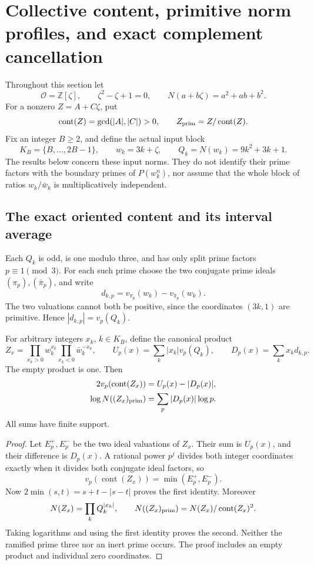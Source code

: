 \section{Collective content, primitive norm profiles, and exact complement cancellation}
\label{sec-cc-collective-profile}

Throughout this section let
\[
 \mathcal O=\mathbb Z[\zeta],\qquad \zeta^2-\zeta+1=0,\qquad
 N(a+b\zeta)=a^2+ab+b^2.
\]
For a nonzero \(Z=A+C\zeta\), put
\[
 \operatorname{cont}(Z)=\gcd(|A|,|C|)>0,
 \qquad Z_{\rm prim}=Z/\operatorname{cont}(Z).
\]
Fix an integer \(B\ge2\), and define the actual input block
\[
 K_B=\{B,\ldots,2B-1\},\qquad w_k=3k+\zeta,
 \qquad Q_k=N(w_k)=9k^2+3k+1.
\]
The results below concern these input norms. They do not identify their
prime factors with the boundary primes of \(P(w_k^n)\), nor assume that
the whole block of ratios \(w_k/\bar w_k\) is multiplicatively independent.

\subsection{The exact oriented content and its interval average}

Each \(Q_k\) is odd, is one modulo three, and has only split prime
factors \(p\equiv1\pmod3\). For each such prime choose the two conjugate
prime ideals \((\pi_p),(\bar\pi_p)\), and write
\[
 d_{k,p}=v_{\pi_p}(w_k)-v_{\bar\pi_p}(w_k).
\]
The two valuations cannot both be positive, since the coordinates
\((3k,1)\) are primitive. Hence \(|d_{k,p}|=v_p(Q_k)\).

\begin{lemma}
\label{cc-signed-content}
For arbitrary integers \(x_k\), \(k\in K_B\), define the canonical product
\[
 Z_x=\prod_{x_k>0}w_k^{x_k}
           \prod_{x_k<0}\bar w_k^{-x_k},\qquad
 U_p(x)=\sum_k|x_k|v_p(Q_k),\qquad
 D_p(x)=\sum_k x_k d_{k,p}.
\]
The empty product is one. Then
\begin{align*}
 2v_p(\operatorname{cont}(Z_x))&=U_p(x)-|D_p(x)|,\\
 \log N((Z_x)_{\rm prim})&=\sum_p|D_p(x)|\log p.
\end{align*}
All sums have finite support.
\end{lemma}
\begin{proof}
Let \(E_p^+,E_p^-\) be the two ideal valuations of \(Z_x\). Their sum
is \(U_p(x)\), and their difference is \(D_p(x)\). A rational power
\(p^j\) divides both integer coordinates exactly when it divides both
conjugate ideal factors, so
\[
 v_p(\operatorname{cont}(Z_x))=\min(E_p^+,E_p^-).
\]
Now \(2\min(s,t)=s+t-|s-t|\) proves the first identity. Moreover
\[
 N(Z_x)=\prod_k Q_k^{|x_k|},\qquad
 N((Z_x)_{\rm prim})=
       N(Z_x)/\operatorname{cont}(Z_x)^2.
\]
Taking logarithms and using the first identity proves the second.
Neither the ramified prime three nor an inert prime occurs. The proof
includes an empty product and individual zero coordinates.
\end{proof}

